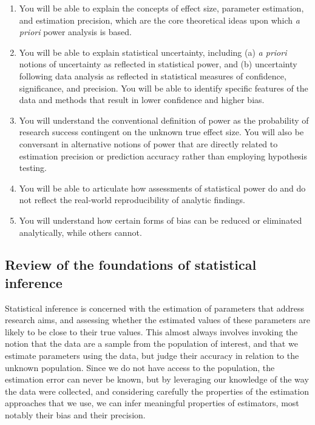 \begin{enumerate}

\item You will be able to explain the concepts of effect size, parameter estimation, and estimation precision, which are the core theoretical ideas upon which {\em a priori} power analysis is based.

\item You will be able to explain statistical uncertainty, including (a) {\em a priori} notions of uncertainty as reflected in statistical power, and (b) uncertainty following data analysis as reflected in statistical measures of confidence, significance, and precision.  You will be able to identify specific features of the data and methods that result in lower confidence and higher bias.

\item You will understand the conventional definition of power as the probability of research success contingent on the unknown true effect size. You will also be conversant in alternative notions of power that are directly related to estimation precision or prediction accuracy rather than employing hypothesis testing.

\item You will be able to articulate how assessments of statistical power do and do not reflect the real-world reproducibility of analytic findings.

\item You will understand how certain forms of bias can be reduced or eliminated analytically, while others cannot.

\end{enumerate}


\subsection{Review of the foundations of statistical inference}

Statistical inference is concerned with the estimation of parameters that address research aims, and assessing whether the estimated values of these parameters are likely to be close to their true values.  This almost always involves invoking the notion that the data are a sample from the population of interest, and that we estimate parameters using the data, but judge their accuracy in relation to the unknown population.  Since we do not have access to the population, the estimation error can never be known, but by leveraging our knowledge of the way the data were collected, and considering carefully the properties of the estimation approaches that we use, we can infer meaningful properties of estimators, most notably their bias and their precision.


